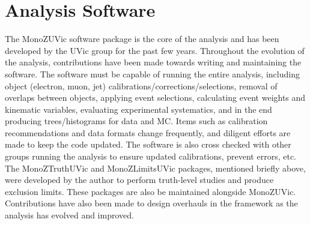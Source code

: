 \section{Analysis Software}
\label{sec:code}

The MonoZUVic software package is the core of the analysis and has been developed by the UVic group for the past few years. Throughout the evolution of the analysis, contributions have been made towards writing and maintaining the software. The software must be capable of running the entire analysis, including object (electron, muon, jet) calibrations/corrections/selections, removal of overlaps between objects, applying event selections, calculating event weights and kinematic variables, evaluating experimental systematics, and in the end producing trees/histograms for data and MC. Items such as calibration recommendations and data formats change frequently, and diligent efforts are made to keep the code updated. The software is also cross checked with other groups running the analysis to ensure updated calibrations, prevent errors, etc. The MonoZTruthUVic and MonoZLimitsUVic packages, mentioned briefly above, were developed by the author to perform truth-level studies and produce exclusion limits. These packages are also be maintained alongside MonoZUVic. Contributions have also been made to design overhauls in the framework as the analysis has evolved and improved.



